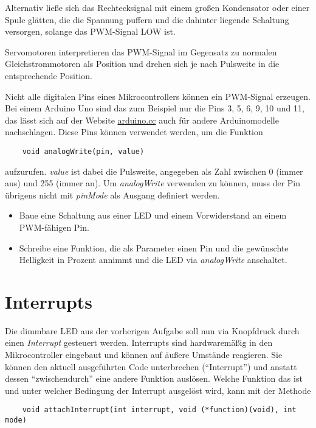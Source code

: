 \documentclass[10pt,a4paper]{article}
\begin{document}
Alternativ ließe sich das Rechtecksignal mit einem großen Kondensator oder einer Spule glätten, die die Spannung puffern und die dahinter liegende Schaltung versorgen, solange das PWM-Signal LOW ist.

\bigskip
Servomotoren interpretieren das PWM-Signal im Gegensatz zu normalen Gleichstrommotoren als Position und drehen sich je nach Pulsweite in die entsprechende Position.

Nicht alle digitalen Pins eines Mikrocontrollers können ein PWM-Signal erzeugen. Bei einem Arduino Uno sind das zum Beispiel nur die Pins 3, 5, 6, 9, 10 und 11, das lässt sich auf der Website \href{https://www.arduino.cc/reference/de/language/functions/analog-io/analogwrite/}{arduino.cc} auch für andere Arduinomodelle nachschlagen. Diese Pins können verwendet werden, um die Funktion

\begin{lstlisting}
	void analogWrite(pin, value)
\end{lstlisting}

aufzurufen. \textit{value} ist dabei die Pulsweite, angegeben als Zahl zwischen 0 (immer aus) und 255 (immer an). Um \textit{analogWrite} verwenden zu können, muss der Pin übrigens nicht mit \textit{pinMode} als Ausgang definiert werden.
\begin{itemize}
	\item Baue eine Schaltung aus einer LED und einem Vorwiderstand an einem PWM-fähigen Pin.
	\item Schreibe eine Funktion, die als Parameter einen Pin und die gewünschte Helligkeit in Prozent annimmt und die LED via \textit{analogWrite} anschaltet.
\end{itemize}





\section{Interrupts}
Die dimmbare LED aus der vorherigen Aufgabe soll nun via Knopfdruck durch einen \emph{Interrupt} gesteuert werden. Interrupts sind hardwaremäßig in den Mikrocontroller eingebaut und können auf äußere Umstände reagieren. Sie können den aktuell ausgeführten Code unterbrechen ("`Interrupt"') und anstatt dessen "`zwischendurch"' eine andere Funktion auslösen. Welche Funktion das ist und unter welcher Bedingung der Interrupt ausgelöst wird, kann mit der Methode

\begin{lstlisting}
	void attachInterrupt(int interrupt, void (*function)(void), int mode)
\end{lstlisting}
\end{document}

